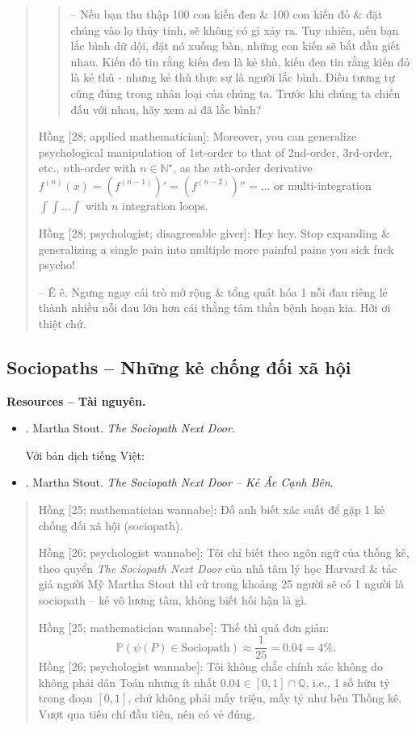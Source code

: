 \documentclass[12pt,twoside]{book}
\begin{document}
\begin{quote}
\begin{quote}
		-- Nếu bạn thu thập 100 con kiến đen \& 100 con kiến đỏ \& đặt chúng vào lọ thủy tinh, sẽ không có gì xảy ra. Tuy nhiên, nếu bạn lắc bình dữ dội, đặt nó xuống bàn, những con kiến sẽ bắt đầu giết nhau. Kiến đỏ tin rằng kiến đen là kẻ thù, kiến đen tin rằng kiến đỏ là kẻ thù - nhưng kẻ thù thực sự là người lắc bình. Điều tương tự cũng đúng trong nhân loại của chúng ta. Trước khi chúng ta chiến đấu với nhau, hãy xem ai đã lắc bình?
	\end{quote}
	
	{\sf Hồng [28; applied mathematician]}: Moreover, you can generalize psychological manipulation of 1st-order to that of 2nd-order, 3rd-order, etc., $n$th-order with $n\in\mathbb{N}^\star$, as the $n$th-order derivative $f^{(n)}(x) = (f^{(n - 1)})' = (f^{(n - 2)})'' = \ldots$ or multi-integration $\int\int\ldots\int$ with $n$ integration loops.
	
	{\sf Hồng [28; psychologist; disagreeable giver]:} Hey hey. Stop expanding \& generalizing a single pain into multiple more painful pains you sick fuck psycho!
	
	-- Ê ê. Ngưng ngay cái trò mở rộng \& tổng quát hóa 1 nỗi đau riêng lẻ thành nhiều nỗi đau lớn hơn cái thằng tâm thần bệnh hoạn kia. Hỡi ơi thiệt chứ.
\end{quote}

\subsection{Sociopaths -- Những kẻ chống đối xã hội}
{\bf \textsf{Resources -- Tài nguyên.}}
\begin{itemize}
	\item \cite{Stout_sociopath}. {\sc Martha Stout}. {\it The Sociopath Next Door}.
	
	Với bản dịch tiếng Việt:
	\item \cite{Stout_sociopath_VN}. {\sc Martha Stout}. {\it The Sociopath Next Door -- Kẻ Ác Cạnh Bên}.
\end{itemize}

\begin{quote}
	{\sf Hồng [25; mathematician wannabe]}: Đố anh biết xác suất để gặp 1 kẻ chống đối xã hội (sociopath).
	
	{\sf Hồng [26; psychologist wannabe]}: Tôi chỉ biết theo ngôn ngữ của thống kê, theo quyển {\it The Sociopath Next Door} của nhà tâm lý học Harvard \& tác giả người Mỹ {\sc Martha Stout} thì cứ trong khoảng 25 người sẽ có 1 người là sociopath -- kẻ vô lương tâm, không biết hối hận là gì.
	
	{\sf Hồng [25; mathematician wannabe]}: Thế thì quá đơn giản:
	\begin{equation*}
		\mathbb{P}(\psi(P)\in\mbox{Sociopath})\approx\frac{1}{25} = 0.04 = 4\%.
	\end{equation*}
	{\sf Hồng [26; psychologist wannabe]}: Tôi không chắc chính xác không do không phải dân Toán nhưng ít nhất $0.04\in[0,1]\cap\mathbb{Q}$, i.e., 1 số hữu tỷ trong đoạn $[0,1]$, chứ không phải mấy triệu, mấy tỷ như bên Thống kê. Vượt qua tiêu chí đầu tiên, nên có vẻ đúng.
\end{quote}
\end{document}
